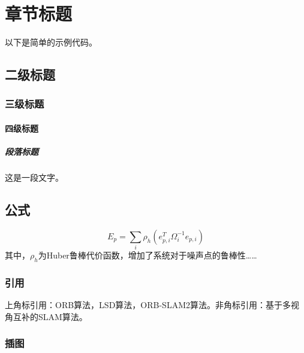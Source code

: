 \chapter{章节标题}
\label{cha:introduction}

以下是简单的示例代码。

\section{二级标题}

\subsection{三级标题}

\subsubsection{四级标题}

\paragraph{段落标题}

这是一段文字。

\section{公式}
\label{sec:equation}

\begin{equation}
\label{eq:error}
	E_p=\sum_i\rho_h(e_{p,i}^T\Omega_i^{-1}e_{p,i})
\end{equation}
其中，$\rho_h$为Huber鲁棒代价函数，增加了系统对于噪声点的鲁棒性……

\subsection{引用}

上角标引用：ORB算法\cite{ORB}，LSD算法，ORB-SLAM2\cite{ORB-SLAM2}算法。非角标引用：基于多视角互补的SLAM算法。

\subsection{插图}

